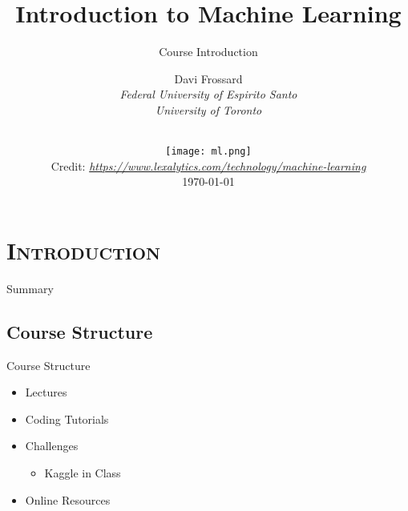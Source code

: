\documentclass[xcolor=x11names,compress]{beamer}
\renewcommand{\(}{\begin{columns}}
\renewcommand{\)}{\end{columns}}
\newcommand{\<}[1]{\begin{column}{#1}}
\renewcommand{\>}{\end{column}}
\begin{document}
\section{\scshape Introduction}
\begin{frame}
\title{Introduction to Machine Learning}
\subtitle{Course Introduction}
\author{
	Davi Frossard\\
	{\it Federal University of Espirito Santo \\ University of Toronto}\\
}
\date{
    \vspace{-3.5em}\\
    \texttt{[image: ml.png]}\\[-1ex]
    {\tiny Credit: {\itshape \url{https://www.lexalytics.com/technology/machine-learning}}}
    \\
	\today
}
\titlepage
\end{frame}

\begin{frame}{Summary}
\tableofcontents
\end{frame}

\subsection{Course Structure}
\begin{frame}{Course Structure}
\begin{itemize}
\item Lectures
\item Coding Tutorials
\item Challenges
\begin{itemize}
\item Kaggle in Class
\end{itemize}
\item Online Resources
\end{itemize}
\end{frame}

\end{document}
